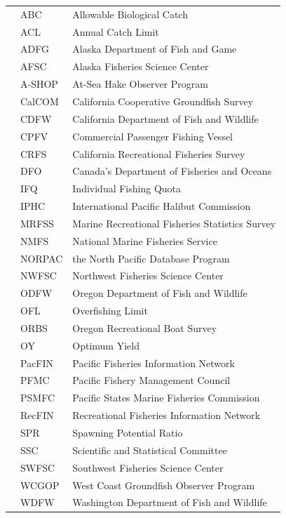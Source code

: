 \begin{center}
\begin{table}[ht]
\begin{tabular}{rll}
     & ABC & Allowable Biological Catch  \\ 
     & ACL  & Annual Catch Limit \\ 
     & ADFG & Alaska Department of Fish and Game \\ 
     & AFSC & Alaska Fisheries Science Center \\ 
     & A-SHOP & At-Sea Hake Observer Program  \\ 
     & CalCOM & California Cooperative Groundfish Survey  \\ 
     & CDFW & California Department of Fish and Wildlife  \\ 
     & CPFV & Commercial Passenger Fishing Vessel \\ 
     & CRFS & California Recreational Fisheries Survey \\ 
     & DFO & Canada’s Department of Fisheries and Oceans  \\ 
     & IFQ & Individual Fishing Quota \\ 
     & IPHC & International Pacific Halibut Commission \\ 
     & MRFSS & Marine Recreational Fisheries Statistics Survey  \\ 
     & NMFS & National Marine Fisheries Service  \\ 
     & NORPAC & the North Pacific Database Program \\ 
     & NWFSC & Northwest Fisheries Science Center  \\ 
     & ODFW & Oregon Department of Fish and Wildlife  \\ 
     & OFL & Overfishing Limit \\ 
     & ORBS & Oregon Recreational Boat Survey  \\ 
     & OY & Optimum Yield \\ 
     & PacFIN & Pacific Fisheries Information Network \\ 
     & PFMC & Pacific Fishery Management Council \\ 
     & PSMFC & Pacific States Marine Fisheries Commission  \\ 
     & RecFIN & Recreational Fisheries Information Network \\ 
     & SPR & Spawning Potential Ratio \\ 
     & SSC & Scientific and Statistical Committee \\ 
     & SWFSC & Southwest Fisheries Science Center  \\ 
     & WCGOP & West Coast Groundfish Observer Program  \\ 
     & WDFW & Washington Department of Fish and Wildlife  \\ 
\end{tabular}
\end{table}

\renewcommand{\arraystretch}{1}

\maketitle

\setcounter{page}{1}
\end{center}


